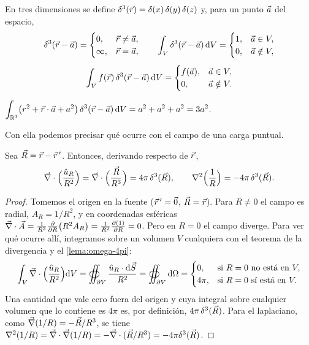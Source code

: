 En tres dimensiones se define $\delta^{3}(\vec{r})=\delta(x)\,\delta(y)\,\delta(z)$ y, para un punto $\vec{a}$ del espacio,
\begin{equation}\label{eq:delta3}
\begin{gathered}
  \delta^{3}(\vec{r}-\vec{a})=\begin{cases}0,&\vec{r}\neq\vec{a},\\\infty,&\vec{r}=\vec{a},\end{cases}\qquad
  \int_{V}\delta^{3}(\vec{r}-\vec{a})\,\mathrm{d} V=\begin{cases}1,&\vec{a}\in V,\\0,&\vec{a}\notin V,\end{cases}\\[4pt]
  \int_{V}f(\vec{r})\,\delta^{3}(\vec{r}-\vec{a})\,\mathrm{d} V=\begin{cases}f(\vec{a}),&\vec{a}\in V,\\0,&\vec{a}\notin V.\end{cases}
\end{gathered}
\end{equation}

\begin{ejemplo}\label{ej:delta3}
$\displaystyle\int_{\mathbb{R}^{3}}\bigl(r^{2}+\vec{r}\cdot\vec{a}+a^{2}\bigr)\,\delta^{3}(\vec{r}-\vec{a})\,\mathrm{d} V=a^{2}+a^{2}+a^{2}=3a^{2}$.
\end{ejemplo}

Con ella podemos precisar qué ocurre con el campo de una carga puntual.

\begin{teorema}\label{teo:delta}
Sea $\vec{R}=\vec{r}-\vec{r}\,'$. Entonces, derivando respecto de $\vec{r}$,
\begin{equation}\label{eq:div-delta}
  \vec{\nabla}\cdot\Bigl(\frac{\hat{u}_{R}}{R^{2}}\Bigr)=\vec{\nabla}\cdot\Bigl(\frac{\vec{R}}{R^{3}}\Bigr)=4\pi\,\delta^{3}(\vec{R}),
  \qquad
  \nabla^{2}\Bigl(\frac{1}{R}\Bigr)=-4\pi\,\delta^{3}(\vec{R}).
\end{equation}
\end{teorema}
\begin{proof}
Tomemos el origen en la fuente ($\vec{r}\,'=\vec{0}$, $\vec{R}=\vec{r}$). Para $R\neq0$ el campo es radial, $A_R=1/R^{2}$, y en coordenadas
esféricas $\vec{\nabla}\cdot\vec{A}=\frac{1}{R^{2}}\frac{\partial }{\partial R}\bigl(R^{2}A_R\bigr)=\frac{1}{R^{2}}\frac{\partial (1)}{\partial R}=0$. Pero en $R=0$ el campo diverge. Para
ver qué ocurre allí, integramos sobre un volumen $V$ cualquiera con el teorema de la divergencia y el \cref{lema:omega-4pi}:
\[
  \int_{V}\vec{\nabla}\cdot\Bigl(\frac{\hat{u}_{R}}{R^{2}}\Bigr)\mathrm{d} V=\oiint_{\partial V}\frac{\hat{u}_{R}\cdot\mathrm{d}\vec{S}}{R^{2}}=\oiint_{\partial V}\mathrm{d}\Omega
  =\begin{cases}0,&\text{si }R=0\text{ no está en }V,\\4\pi,&\text{si }R=0\text{ sí está en }V.\end{cases}
\]
Una cantidad que vale cero fuera del origen y cuya integral sobre cualquier volumen que lo contiene es $4\pi$ es, por definición,
$4\pi\,\delta^{3}(\vec{R})$. Para el laplaciano, como $\vec{\nabla}(1/R)=-\vec{R}/R^{3}$, se tiene
$\nabla^{2}(1/R)=\vec{\nabla}\cdot\vec{\nabla}(1/R)=-\vec{\nabla}\cdot(\vec{R}/R^{3})=-4\pi\delta^{3}(\vec{R})$.
\end{proof}

